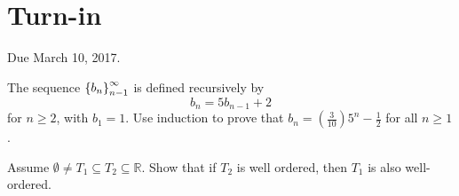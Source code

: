 \documentclass[12pt]{article}
\begin{document}
\newpage
\section{Turn-in} 

Due March 10, 2017.


\begin{qu}
The sequence $\left\{b_n\right\}_{n-1}^\infty$ is defined recursively by 
$$b_n=5b_{n-1}+2$$
for $n\geq 2$, with $b_1=1$. Use induction to prove that $b_n=\left(\frac{3}{10}\right)5^n-\frac{1}{2}$ for all $n\geq 1$.
\end{qu}



\begin{qu}
Assume $\emptyset \ne T_1 \subseteq T_2 \subseteq \mathbb{R}$. Show that if $T_2$ is well ordered, then $T_1$ is also well-ordered.
\end{qu}
\end{document}
